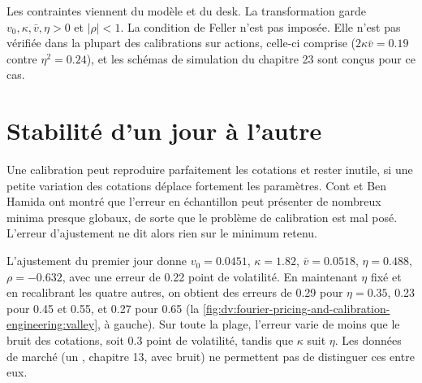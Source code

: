 Les contraintes viennent du modèle et du desk. La transformation garde $v_0,\kappa,\bar v,\eta>0$ et $|\rho|<1$. La condition de Feller
n'est pas imposée. Elle n'est pas vérifiée dans la plupart des calibrations sur actions, celle-ci comprise ($2\kappa\bar v=0.19$ contre $\eta^2=0.24$), et les schémas de simulation
du chapitre 23 sont conçus pour ce cas.

\section{Stabilité d'un jour à l'autre}

Une calibration peut reproduire parfaitement les cotations et rester inutile, si une petite variation des cotations déplace fortement les paramètres. Cont et
Ben Hamida ont montré que l'erreur en échantillon peut présenter de nombreux minima presque globaux, de sorte que le problème de calibration est mal posé. L'erreur d'ajustement ne dit alors
rien sur le minimum retenu.

\begin{example}\label{ex:dv:fourier-pricing-and-calibration-engineering:valley}
L'ajustement du premier jour donne $v_0=0.0451$, $\kappa=1.82$, $\bar v=0.0518$, $\eta=0.488$, $\rho=-0.632$, avec une erreur de 0.22 point de volatilité. En maintenant
$\eta$ fixé et en recalibrant les quatre autres, on obtient des erreurs de 0.29 pour $\eta=0.35$, 0.23 pour 0.45 et 0.55, et 0.27 pour 0.65
(la \cref{fig:dv:fourier-pricing-and-calibration-engineering:valley}, à gauche). Sur toute la plage, l'erreur varie de moins que le bruit des
cotations, soit 0.3 point de volatilité, tandis que $\kappa$ suit $\eta$. Les données de marché (un , chapitre 13, avec bruit) ne permettent pas de distinguer ces
 entre eux.
\end{example}

